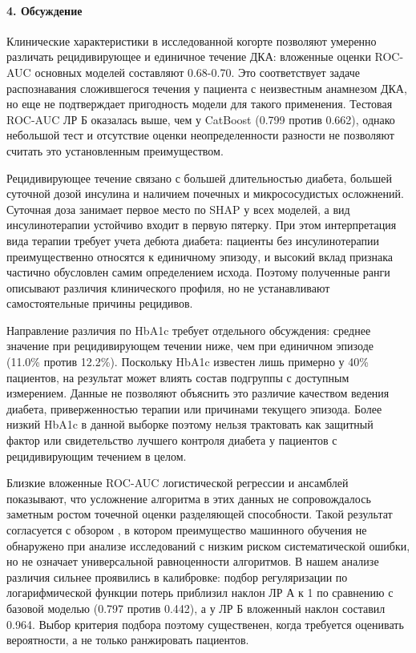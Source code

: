 \documentclass{crm-article}
\begin{document}
\paragraph{4. Обсуждение}\label{sec4}

Клинические характеристики в исследованной когорте позволяют умеренно различать рецидивирующее и единичное течение ДКА: вложенные оценки ROC-AUC основных моделей составляют 0.68-0.70. Это соответствует задаче распознавания сложившегося течения у пациента с неизвестным анамнезом ДКА, но еще не подтверждает пригодность модели для такого применения. Тестовая ROC-AUC ЛР Б оказалась выше, чем у CatBoost (0.799 против 0.662), однако небольшой тест и отсутствие оценки неопределенности разности не позволяют считать это установленным преимуществом.

Рецидивирующее течение связано с большей длительностью диабета, большей суточной дозой инсулина и наличием почечных и микрососудистых осложнений. Суточная доза занимает первое место по SHAP у всех моделей, а вид инсулинотерапии устойчиво входит в первую пятерку. При этом интерпретация вида терапии требует учета дебюта диабета: пациенты без инсулинотерапии преимущественно относятся к единичному эпизоду, и высокий вклад признака частично обусловлен самим определением исхода. Поэтому полученные ранги описывают различия клинического профиля, но не устанавливают самостоятельные причины рецидивов.

Направление различия по HbA1c требует отдельного обсуждения: среднее значение при рецидивирующем течении ниже, чем при единичном эпизоде (11.0\% против 12.2\%). Поскольку HbA1c известен лишь примерно у 40\% пациентов, на результат может влиять состав подгруппы с доступным измерением. Данные не позволяют объяснить это различие качеством ведения диабета, приверженностью терапии или причинами текущего эпизода. Более низкий HbA1c в данной выборке поэтому нельзя трактовать как защитный фактор или свидетельство лучшего контроля диабета у пациентов с рецидивирующим течением в целом.

Близкие вложенные ROC-AUC логистической регрессии и ансамблей показывают, что усложнение алгоритма в этих данных не сопровождалось заметным ростом точечной оценки разделяющей способности. Такой результат согласуется с обзором \cite{ref16}, в котором преимущество машинного обучения не обнаружено при анализе исследований с низким риском систематической ошибки, но не означает универсальной равноценности алгоритмов. В нашем анализе различия сильнее проявились в калибровке: подбор регуляризации по логарифмической функции потерь приблизил наклон ЛР А к 1 по сравнению с базовой моделью (0.797 против 0.442), а у ЛР Б вложенный наклон составил 0.964. Выбор критерия подбора поэтому существенен, когда требуется оценивать вероятности, а не только ранжировать пациентов.
\end{document}
